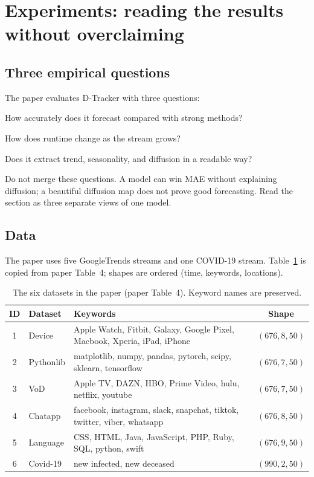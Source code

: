 \section{Experiments: reading the results without overclaiming}
\label{sec:experiments}

\subsection{Three empirical questions}

The paper evaluates D-Tracker with three questions:
\begin{description}[leftmargin=1.8em,style=nextline]
  \item[Q1 --- Accuracy.] How accurately does it forecast compared with strong methods?
  \item[Q2 --- Scalability.] How does runtime change as the stream grows?
  \item[Q3 --- Effectiveness.] Does it extract trend, seasonality, and diffusion in a readable way?
\end{description}
Do not merge these questions. A model can win MAE without explaining diffusion; a beautiful diffusion
map does not prove good forecasting. Read the section as three separate views of one model.

\subsection{Data}

The paper uses five GoogleTrends streams and one COVID-19 stream. Table~\ref{tab:datasets} is copied
from paper Table~4; shapes are ordered (time, keywords, locations).

\begin{table}[htbp]
  \centering
  \small
  \caption{The six datasets in the paper (paper Table~4). Keyword names are preserved.}
  \label{tab:datasets}
  \begin{tabular}{@{}cl>{\raggedright\arraybackslash}p{5.6cm}c@{}}
    \toprule
    ID & Dataset & Keywords & Shape \\
    \midrule
    1 & Device & Apple Watch, Fitbit, Galaxy, Google Pixel, Macbook, Xperia, iPad, iPhone & $(676,8,50)$ \\
    2 & Pythonlib & matplotlib, numpy, pandas, pytorch, scipy, sklearn, tensorflow & $(676,7,50)$ \\
    3 & VoD & Apple TV, DAZN, HBO, Prime Video, hulu, netflix, youtube & $(676,7,50)$ \\
    4 & Chatapp & facebook, instagram, slack, snapchat, tiktok, twitter, viber, whatsapp & $(676,8,50)$ \\
    5 & Language & CSS, HTML, Java, JavaScript, PHP, Ruby, SQL, python, swift & $(676,9,50)$ \\
    6 & Covid-19 & new infected, new deceased & $(990,2,50)$ \\
    \bottomrule
  \end{tabular}
\end{table}

